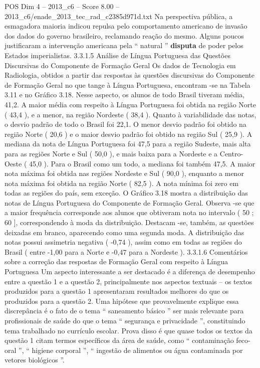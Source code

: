\begin{textsample}{POS Dim 4 – 2013\_c6 – Score 8.00 – 2013\_c6/enade\_2013\_tec\_rad\_c2385d971d.txt}
Na perspectiva pública, a esmagadora maioria indicou repulsa pelo comportamento americano de invasão dos dados do governo brasileiro, reclamando reação do mesmo.
Alguns poucos justificaram a intervenção americana pela “ natural ” \textbf{disputa} de poder pelos Estados imperialistas. 3.3.1.5 Análise de Língua Portuguesa das Questões Discursivas do Componente de Formação Geral Os dados de Tecnologia em Radiologia, obtidos a partir das respostas às questões discursivas do Componente de Formação Geral no que tange à Língua Portuguesa, encontram -se na Tabela 3.11 e no Gráfico 3.18.
Nesse aspecto, os alunos de todo Brasil tiveram média, 41,2.
A maior média com respeito à Língua Portuguesa foi obtida na região Norte ( 43,4 ), e a menor, na região Nordeste ( 38,4 ).
Quanto à variabilidade das notas, o desvio padrão de todo o Brasil foi 22,1.
O menor desvio padrão foi obtido na região Norte ( 20,6 ) e o maior desvio padrão foi obtido na região Sul ( 25,9 ).
A mediana da nota de Língua Portuguesa foi 47,5 para a região Sudeste, mais alta para as regiões Norte e Sul ( 50,0 ), e mais baixa para a Nordeste e a Centro-Oeste ( 45,0 ).
Para o Brasil como um todo, a mediana foi também 47,5.
A maior nota máxima foi obtida nas regiões Nordeste e Sul ( 90,0 ), enquanto a menor nota máxima foi obtida na região Norte ( 82,5 ).
A nota mínima foi zero em todas as regiões do país, sem exceção.
O Gráfico 3.18 mostra a distribuição das notas de Língua Portuguesa do Componente de Formação Geral.
Observa -se que a maior frequência corresponde aos alunos que obtiveram nota no intervalo ( 50 ; 60 ], correspondendo à moda da distribuição.
Destacam -se, também, as questões deixadas em branco, aparecendo como uma segunda moda.
A distribuição das notas possui assimetria negativa ( -0,74 ), assim como em todas as regiões do Brasil ( entre -1,00 para a Norte e -0,47 para a Nordeste ). 3.3.1.6 Comentários sobre a correção das respostas de Formação Geral com respeito à Língua Portuguesa Um aspecto interessante a ser destacado é a diferença de desempenho entre a questão 1 e a questão 2, principalmente nos aspectos textuais – os textos produzidos para a questão 1 apresentaram resultados melhores do que os produzidos para a questão 2.
Uma hipótese que provavelmente explique essa discrepância é o fato de o tema “ saneamento básico ” ser mais relevante para profissionais de saúde do que o tema “ segurança e privacidade ”, constituindo tema trabalhado no currículo escolar.
Prova disso é que quase todos os textos da questão 1 citam termos específicos da área de saúde, como “ contaminação feco-oral ”, “ higiene corporal ”, “ ingestão de alimentos ou água contaminada por vetores biológicos ”.

\end{textsample}
